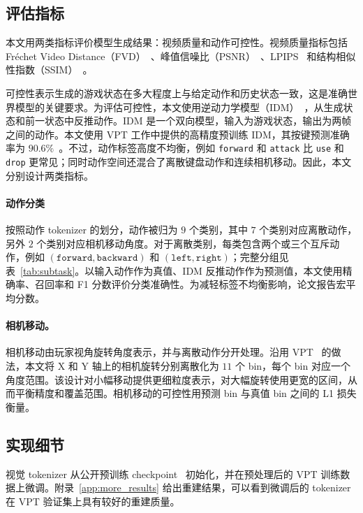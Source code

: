 \documentclass{article} %
\begin{document}
\subsection{评估指标}
\label{sec:eval-metric}

本文用两类指标评价模型生成结果：视频质量和动作可控性。视频质量指标包括 Fréchet Video Distance（FVD）~\citep{unterthiner2018towards}、峰值信噪比（PSNR）~\citep{hore2010image}、LPIPS~\citep{zhang2018unreasonable} 和结构相似性指数（SSIM）~\citep{wang2004image}。

可控性表示生成的游戏状态在多大程度上与给定动作和历史状态一致，这是准确世界模型的关键要求。为评估可控性，本文使用逆动力学模型（IDM）~\citep{baker2022video}，从生成状态和前一状态中反推动作。IDM 是一个双向模型，输入为游戏状态，输出为两帧之间的动作。本文使用 VPT 工作中提供的高精度预训练 IDM，其按键预测准确率为 $90.6 \%$~\citep{baker2022video}。不过，动作标签高度不均衡，例如 \texttt{forward} 和 \texttt{attack} 比 \texttt{use} 和 \texttt{drop} 更常见；同时动作空间还混合了离散键盘动作和连续相机移动。因此，本文分别设计两类指标。

\paragraph{动作分类} 
按照动作 tokenizer 的划分，动作被归为 $9$ 个类别，其中 $7$ 个类别对应离散动作，另外 $2$ 个类别对应相机移动角度。对于离散类别，每类包含两个或三个互斥动作，例如 $(\texttt{forward}, \texttt{backward})$ 和 $(\texttt{left}, \texttt{right})$；完整分组见表~\ref{tab:subtask}。以输入动作作为真值、IDM 反推动作作为预测值，本文使用精确率、召回率和 F1 分数评价分类准确性。为减轻标签不均衡影响，论文报告宏平均分数。

\paragraph{相机移动。} 
相机移动由玩家视角旋转角度表示，并与离散动作分开处理。沿用 VPT~\citep{baker2022video} 的做法，本文将 X 和 Y 轴上的相机旋转分别离散化为 $11$ 个 bin，每个 bin 对应一个角度范围。该设计对小幅移动提供更细粒度表示，对大幅旋转使用更宽的区间，从而平衡精度和覆盖范围。相机移动的可控性用预测 bin 与真值 bin 之间的 L1 损失衡量。

\subsection{实现细节}

视觉 tokenizer 从公开预训练 checkpoint~\citep{patil2024amused} 初始化，并在预处理后的 VPT 训练数据上微调。附录~\ref{app:more_results} 给出重建结果，可以看到微调后的 tokenizer 在 VPT 验证集上具有较好的重建质量。
\end{document}
